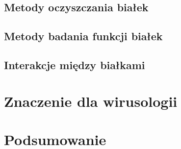 \documentclass[two column, twoside, a4paper]{article}
\begin{document}
\blindtext[3]
\subsection{Metody oczyszczania białek}

\blindtext[3]
\subsection{Metody badania funkcji białek}

\blindtext[3]
\subsection{Interakcje między białkami}

\blindtext[3]
\section{Znaczenie dla wirusologii}

\blindtext[3]
\section{Podsumowanie}

\blindtext[3]
<++>

\printbibliography
\end{document}
